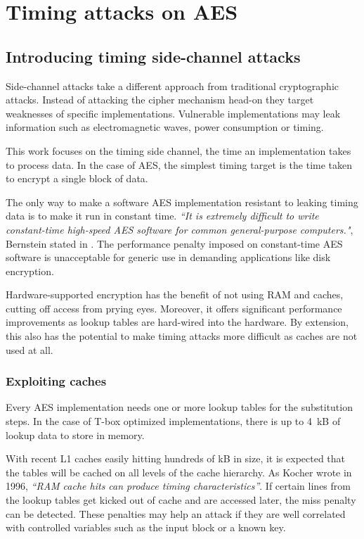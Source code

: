 \documentclass[thesis=B,english]{FITthesis}[2019/03/06]
\begin{document}
\chapter{Timing attacks on AES}

\section{Introducing timing side-channel attacks}
Side-channel attacks take a different approach from traditional cryptographic attacks.
Instead of attacking the cipher mechanism head-on they target weaknesses of specific implementations.
Vulnerable implementations may leak information such as electromagnetic waves, power consumption or timing.

This work focuses on the timing side channel, the time an implementation takes to process data.
In the case of AES, the simplest timing target is the time taken to encrypt a single block of data.

The only way to make a software AES implementation resistant to leaking timing data is to make it run in constant time.
\textit{``It is extremely difficult to write constant-time high-speed AES software for common general-purpose computers."}, Bernstein stated in \cite[Abstract]{bernstein2005cache}.
The performance penalty imposed on constant-time AES software is unacceptable for generic use in demanding applications like disk encryption.

Hardware-supported encryption has the benefit of not using RAM and caches, cutting off access from prying eyes.
Moreover, it offers significant performance improvements as lookup tables are hard-wired into the hardware.
By extension, this also has the potential to make timing attacks more difficult as caches are not used at all.

\subsection{Exploiting caches}
Every AES implementation needs one or more lookup tables for the substitution steps.
In the case of T-box optimized implementations, there is up to 4~kB of lookup data to store in memory.

With recent L1 caches easily hitting hundreds of kB in size, it is expected that the tables will be cached on all levels of the cache hierarchy.
As Kocher wrote in 1996, \textit{``RAM cache hits can produce timing characteristics''}\cite[section 11]{kocher1996}.
If certain lines from the lookup tables get kicked out of cache and are accessed later, the miss penalty can be detected.
These penalties may help an attack if they are well correlated with controlled variables such as the input block or a known key.
\end{document}

